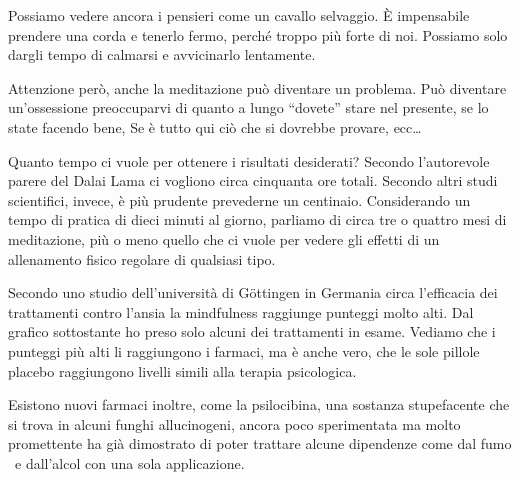 \documentclass[12pt]{book} %
\begin{document}
Possiamo vedere ancora i pensieri come un cavallo selvaggio. È impensabile prendere una corda e tenerlo fermo, perché
troppo più forte di noi. Possiamo solo dargli tempo di calmarsi e avvicinarlo lentamente. 

Attenzione però, anche la meditazione può diventare un problema. Può diventare un'ossessione
preoccuparvi di quanto a lungo “dovete” stare nel presente, se lo state facendo bene, Se è tutto qui ciò che si
dovrebbe provare, ecc…

Quanto tempo ci vuole per ottenere i risultati desiderati? Secondo l'autorevole parere del Dalai Lama ci vogliono circa
cinquanta ore totali. Secondo altri studi scientifici, invece, è più prudente prevederne un centinaio. Considerando un
tempo di pratica di dieci minuti al giorno, parliamo di circa tre o quattro mesi di meditazione, più o meno quello che
ci vuole per vedere gli effetti di un allenamento fisico regolare di qualsiasi tipo.

Secondo uno studio dell'università di Göttingen in Germania circa l'efficacia
dei trattamenti contro
l'ansia la mindfulness raggiunge punteggi molto alti. Dal grafico sottostante ho preso solo alcuni dei trattamenti in esame.
Vediamo che i punteggi più alti li raggiungono i farmaci, ma è anche vero, che le sole pillole placebo raggiungono
livelli simili alla terapia psicologica.

\begin{figure}[H]
  \centering
\end{figure}

Esistono nuovi farmaci inoltre, come la psilocibina, una sostanza stupefacente che si trova in alcuni funghi
allucinogeni, ancora poco sperimentata ma molto promettente ha già dimostrato di poter trattare alcune dipendenze come
dal fumo \ e dall'alcol con una sola
applicazione.
\end{document}
